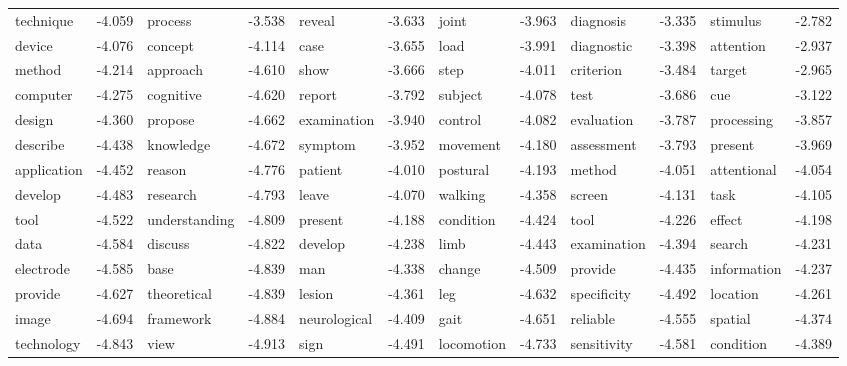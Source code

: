 \documentclass{article}
\begin{document}
\begin{table}
{\begin{tabular}{|l r|l r|l r|l r|l r|l r|}
technique & -4.059 & process & -3.538 & reveal & -3.633 & joint & -3.963 & diagnosis & -3.335 & stimulus & -2.782\\
device & -4.076 & concept & -4.114 & case & -3.655 & load & -3.991 & diagnostic & -3.398 & attention & -2.937\\
method & -4.214 & approach & -4.610 & show & -3.666 & step & -4.011 & criterion & -3.484 & target & -2.965\\
computer & -4.275 & cognitive & -4.620 & report & -3.792 & subject & -4.078 & test & -3.686 & cue & -3.122\\
design & -4.360 & propose & -4.662 & examination & -3.940 & control & -4.082 & evaluation & -3.787 & processing & -3.857\\
describe & -4.438 & knowledge & -4.672 & symptom & -3.952 & movement & -4.180 & assessment & -3.793 & present & -3.969\\
application & -4.452 & reason & -4.776 & patient & -4.010 & postural & -4.193 & method & -4.051 & attentional & -4.054\\
develop & -4.483 & research & -4.793 & leave & -4.070 & walking & -4.358 & screen & -4.131 & task & -4.105\\
tool & -4.522 & understanding & -4.809 & present & -4.188 & condition & -4.424 & tool & -4.226 & effect & -4.198\\
data & -4.584 & discuss & -4.822 & develop & -4.238 & limb & -4.443 & examination & -4.394 & search & -4.231\\
electrode & -4.585 & base & -4.839 & man & -4.338 & change & -4.509 & provide & -4.435 & information & -4.237\\
provide & -4.627 & theoretical & -4.839 & lesion & -4.361 & leg & -4.632 & specificity & -4.492 & location & -4.261\\
image & -4.694 & framework & -4.884 & neurological & -4.409 & gait & -4.651 & reliable & -4.555 & spatial & -4.374\\
technology & -4.843 & view & -4.913 & sign & -4.491 & locomotion & -4.733 & sensitivity & -4.581 & condition & -4.389\\
\hline
\end{tabular}
}
\end{table}
\end{document}

